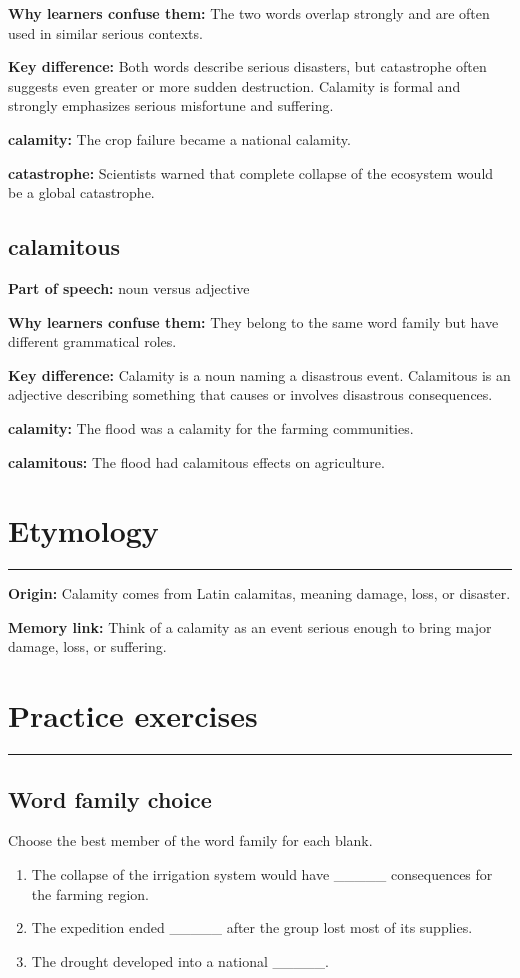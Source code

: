 \documentclass[11pt]{article}
\newcommand{\sectionrule}{\par\vspace{-0.5em}\noindent\textcolor{Accent}{\rule{\linewidth}{0.6pt}}\par}
\begin{document}
\textbf{Why learners confuse them:} The two words overlap strongly and are often used in similar serious contexts.

\textbf{Key difference:} Both words describe serious disasters, but catastrophe often suggests even greater or more sudden destruction. Calamity is formal and strongly emphasizes serious misfortune and suffering.

\textbf{calamity:} The crop failure became a national calamity.

\textbf{catastrophe:} Scientists warned that complete collapse of the ecosystem would be a global catastrophe.

\subsection{calamitous}
\textbf{Part of speech:} noun versus adjective

\textbf{Why learners confuse them:} They belong to the same word family but have different grammatical roles.

\textbf{Key difference:} Calamity is a noun naming a disastrous event. Calamitous is an adjective describing something that causes or involves disastrous consequences.

\textbf{calamity:} The flood was a calamity for the farming communities.

\textbf{calamitous:} The flood had calamitous effects on agriculture.

\section{Etymology}
\sectionrule
\textbf{Origin:} Calamity comes from Latin calamitas, meaning damage, loss, or disaster.

\textbf{Memory link:} Think of a calamity as an event serious enough to bring major damage, loss, or suffering.

\section{Practice exercises}
\sectionrule
\subsection{Word family choice}
Choose the best member of the word family for each blank.

\begin{enumerate}
  \item The collapse of the irrigation system would have \_\_\_\_\_ consequences for the farming region.
  \item The expedition ended \_\_\_\_\_ after the group lost most of its supplies.
  \item The drought developed into a national \_\_\_\_\_.
\end{enumerate}
\end{document}
